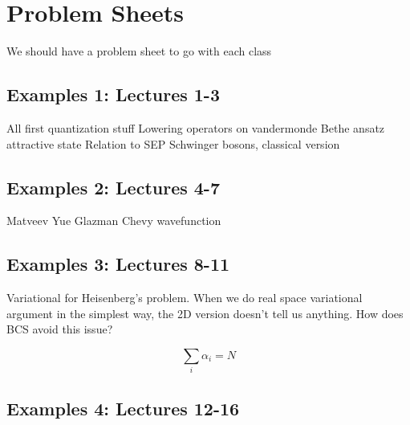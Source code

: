\section{Problem Sheets}


We should have a problem sheet to go with each class

\subsection{Examples 1: Lectures 1-3}

All first quantization stuff
Lowering operators on vandermonde
Bethe ansatz attractive state
Relation to SEP
Schwinger bosons, classical version

\subsection{Examples 2: Lectures 4-7}

Matveev Yue Glazman
Chevy wavefunction

\subsection{Examples 3: Lectures 8-11}

Variational for Heisenberg's problem. When we do real space variational argument in the simplest way, the 2D version doesn't tell us anything. How does BCS avoid this issue?

\[\sum_i \alpha_i = N\]

\subsection{Examples 4: Lectures 12-16}



